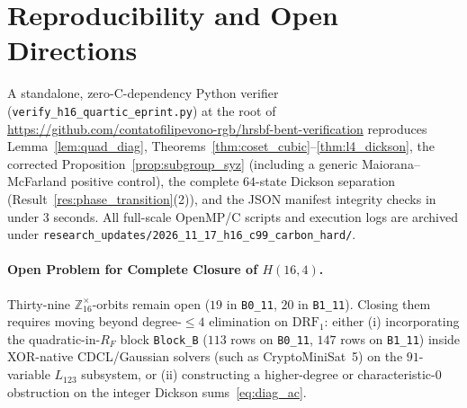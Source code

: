 \documentclass[11pt,a4paper]{article}
\theoremstyle{definition}
\newcommand{\Z}{\mathbb{Z}}
\begin{document}
\section{Reproducibility and Open Directions}
\label{sec:repro}

A standalone, zero-C-dependency Python verifier (\texttt{verify\_h16\_quartic\_eprint.py}) at the root of \url{https://github.com/contatofilipevono-rgb/hrsbf-bent-verification} reproduces Lemma~\ref{lem:quad_diag}, Theorems~\ref{thm:coset_cubic}--\ref{thm:l4_dickson}, the corrected Proposition~\ref{prop:subgroup_syz} (including a generic Maiorana--McFarland positive control), the complete $64$-state Dickson separation (Result~\ref{res:phase_transition}(2)), and the JSON manifest integrity checks in under $3$ seconds. All full-scale OpenMP/C scripts and execution logs are archived under \texttt{research\_updates/2026\_11\_17\_h16\_c99\_carbon\_hard/}.

\paragraph{Open Problem for Complete Closure of $H(16,4)$.}
Thirty-nine $\Z_{16}^\times$-orbits remain open ($19$ in \texttt{B0\_11}, $20$ in \texttt{B1\_11}). Closing them requires moving beyond degree-$\le 4$ elimination on $\mathrm{DRF}_1$: either (i) incorporating the quadratic-in-$R_F$ block \texttt{Block\_B} ($113$ rows on \texttt{B0\_11}, $147$ rows on \texttt{B1\_11}) inside XOR-native CDCL/Gaussian solvers (such as CryptoMiniSat~5) on the $91$-variable $L_{123}$ subsystem, or (ii) constructing a higher-degree or characteristic-$0$ obstruction on the integer Dickson sums~\eqref{eq:diag_ac}.
\end{document}
